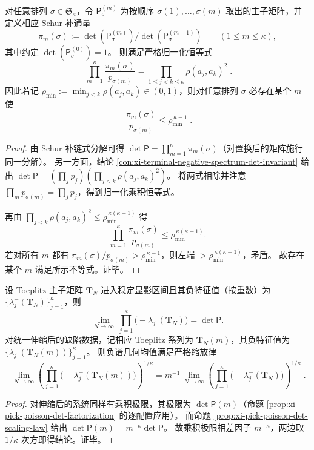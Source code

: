 \begin{conclusion}\label{con:xi-terminal-pick-poisson-schur-vandermonde-externalization}
对任意排列 \(\sigma\in\mathfrak S_\kappa\)，令 \(\mathsf P^{(m)}_\sigma\) 为按顺序 \(\sigma(1),\dots,\sigma(m)\) 取出的主子矩阵，并定义相应 Schur 补通量
\[
\pi_m(\sigma)
:=\det(\mathsf P^{(m)}_\sigma)\Big/\det(\mathsf P^{(m-1)}_\sigma)
\qquad(1\le m\le\kappa),
\]
其中约定 \(\det(\mathsf P^{(0)}_\sigma)=1\)。
则满足严格归一化恒等式
\[
\boxed{\;
\prod_{m=1}^{\kappa}\frac{\pi_m(\sigma)}{p_{\sigma(m)}}
=\prod_{1\le j<k\le\kappa}\rho(a_j,a_k)^2\; } .
\]
因此若记 \(\rho_{\min}:=\min_{j<k}\rho(a_j,a_k)\in(0,1)\)，则对任意排列 \(\sigma\) 必存在某个 \(m\) 使
\[
\boxed{\;
\frac{\pi_m(\sigma)}{p_{\sigma(m)}}\le \rho_{\min}^{\,\kappa-1}\; } .
\]
\end{conclusion}
\begin{proof}
由 Schur 补链式分解可得 \(\det\mathsf P=\prod_{m=1}^{\kappa}\pi_m(\sigma)\)（对置换后的矩阵施行同一分解）。
另一方面，结论 \ref{con:xi-terminal-negative-spectrum-det-invariant} 给出
\(
\det\mathsf P=(\prod_j p_j)(\prod_{j<k}\rho(a_j,a_k)^2)
\)。
将两式相除并注意 \(\prod_m p_{\sigma(m)}=\prod_j p_j\)，得到归一化乘积恒等式。
\par
再由 \(\prod_{j<k}\rho(a_j,a_k)^2\le \rho_{\min}^{\,\kappa(\kappa-1)}\) 得
\[
\prod_{m=1}^{\kappa}\frac{\pi_m(\sigma)}{p_{\sigma(m)}}
\le \rho_{\min}^{\,\kappa(\kappa-1)}.
\]
若对所有 \(m\) 都有 \(\pi_m(\sigma)/p_{\sigma(m)}>\rho_{\min}^{\,\kappa-1}\)，则左端 \(>\rho_{\min}^{\,\kappa(\kappa-1)}\)，矛盾。
故存在某个 \(m\) 满足所示不等式。证毕。
\end{proof}

\begin{conclusion}\label{con:xi-terminal-toeplitz-negative-geometric-mean-homothety}
设 Toeplitz 主子矩阵 \(\mathbf{T}_N\) 进入稳定显影区间且其负特征值（按重数）为 \(\{\lambda_j^{-}(\mathbf{T}_N)\}_{j=1}^{\kappa}\)，则
\[
\lim_{N\to\infty}\ \prod_{j=1}^{\kappa}\bigl(-\lambda_j^{-}(\mathbf{T}_N)\bigr)=\det\mathsf P.
\]
对统一伸缩后的缺陷数据，记相应 Toeplitz 系列为 \(\mathbf{T}_N(m)\)，其负特征值为 \(\{\lambda_j^{-}(\mathbf{T}_N(m))\}_{j=1}^{\kappa}\)。
则负谱几何均值满足严格缩放律
\[
\boxed{\;
\lim_{N\to\infty}\left(\prod_{j=1}^{\kappa}\bigl(-\lambda_j^{-}(\mathbf{T}_N(m))\bigr)\right)^{1/\kappa}
=m^{-1}\,
\lim_{N\to\infty}\left(\prod_{j=1}^{\kappa}\bigl(-\lambda_j^{-}(\mathbf{T}_N)\bigr)\right)^{1/\kappa}\; } .
\]
\end{conclusion}
\begin{proof}
对伸缩后的系统同样有乘积极限，其极限为 \(\det\mathsf P(m)\)（命题 \ref{prop:xi-pick-poisson-det-factorization} 的逐配置应用）。
而命题 \ref{prop:xi-pick-poisson-det-scaling-law} 给出 \(\det\mathsf P(m)=m^{-\kappa}\det\mathsf P\)。
故乘积极限相差因子 \(m^{-\kappa}\)，两边取 \(1/\kappa\) 次方即得结论。证毕。
\end{proof}

